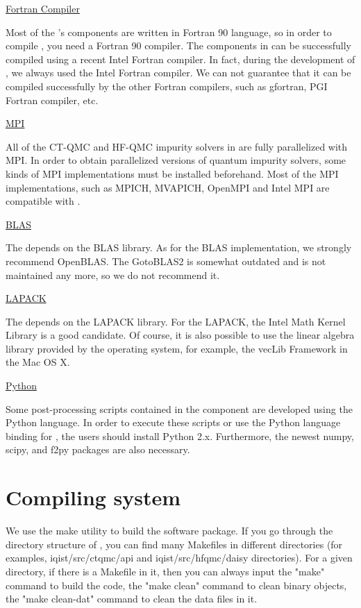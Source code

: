\underline{Fortran Compiler}

Most of the {\iqist}'s components are written in Fortran 90 language, so in order to compile {\iqist}, you need a Fortran 90 compiler. The components in {\iqist} can be successfully compiled using a recent Intel Fortran compiler. In fact, during the development of {\iqist}, we always used the Intel Fortran compiler. We can not guarantee that it can be compiled successfully by the other Fortran compilers, such as gfortran, PGI Fortran compiler, etc.

\underline{MPI}

All of the CT-QMC and HF-QMC impurity solvers in {\iqist} are fully parallelized with MPI. In order to obtain 
parallelized versions of quantum impurity solvers, some kinds of MPI implementations must be installed beforehand. Most of the MPI implementations, such as MPICH, MVAPICH, OpenMPI and Intel MPI are compatible with {\iqist}.

\underline{BLAS}

The {\iqist} depends on the BLAS library. As for the BLAS implementation, we strongly recommend OpenBLAS. The GotoBLAS2 is somewhat outdated and is not maintained any more, so we do not recommend it.

\underline{LAPACK}

The {\iqist} depends on the LAPACK library. For the LAPACK, the Intel Math Kernel Library is a good candidate. Of course, it is also possible to use the linear algebra library provided by the operating system, for example, the vecLib Framework in the Mac OS X.

\underline{Python}

Some post-processing scripts contained in the {\hibiscus} component are developed using the Python language. In order to execute these scripts or use the Python language binding for {\iqist}, the users should install Python 2.x. Furthermore, the newest numpy, scipy, and f2py packages are also necessary.

\section{Compiling system}

We use the make utility to build the {\iqist} software package. If you go through the directory structure of {\iqist}, you can find many Makefiles in different directories (for examples, iqist/src/ctqmc/api and iqist/src/hfqmc/daisy directories). For a given directory, if there is a Makefile in it, then you can always input the "make" command to build the code, the "make clean" command to clean binary objects, the "make clean-dat" command to clean the data files in it.

